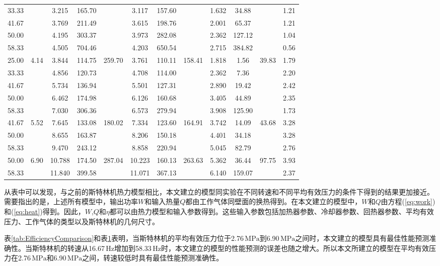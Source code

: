 \begin{table}
\begin{center}
\begin{tabular}{cccccccccccc}
		33.33	&&3.215	&165.70	&&3.117	&157.60	&&1.632	&34.88	&&1.21\\
		41.67	&&3.769	&211.49	&&3.615	&198.76	&&2.001	&65.37	&&1.21\\
		50.00	&&4.195	&303.37	&&3.973	&282.08	&&2.362	&127.12	&&1.04\\
		58.33	&&4.505	&704.46	&&4.203	&650.54	&&2.715	&384.82	&&0.56\\
		\midrule
		25.00	&\multirow{5}{*}{4.14}	&3.844	&114.75	&\multirow{5}{*}{259.70}	&3.761	&110.11	&\multirow{5}{*}{158.41}	&1.818	&1.56	&\multirow{5}{*}{39.83}	&1.79\\
		33.33	&&4.856	&120.73	&&4.708	&114.00	&&2.362	&7.36	&&2.20\\
		41.67	&&5.734	&136.94	&&5.501	&127.31	&&2.890	&19.42	&&2.42\\
		50.00	&&6.462	&174.98	&&6.126	&160.68	&&3.405	&44.89	&&2.35\\
		58.33	&&7.030	&306.36	&&6.573	&279.94	&&3.908	&125.90	&&1.73\\
		\midrule
		41.67	&\multirow{3}{*}{5.52}	&7.645	&133.08	&\multirow{3}{*}{180.02}	&7.334	&123.60	&\multirow{3}{*}{164.91}	&3.742	&14.09	&\multirow{3}{*}{43.68}	&3.28\\
		50.00	&&8.655	&163.87	&&8.206	&150.18	&&4.401	&34.18	&&3.28\\
		58.33	&&9.470	&243.12	&&8.858	&220.94	&&5.045	&82.79	&&2.76\\
		\midrule
		50.00	&\multirow{2}{*}{6.90}	&10.788	&174.50	&\multirow{2}{*}{287.04}	&10.223	&160.13	&\multirow{2}{*}{263.63}	&5.362	&36.44	&\multirow{2}{*}{97.75}		&3.93\\
		58.33	&&11.840	&399.58	&&11.071	&367.13	&&6.140	&159.07	&&2.37\\
		\bottomrule
	\end{tabular}
	\end{center}
	\label{tab:PowerComparison}
\end{table}

从表中可以发现，与之前的斯特林机热力模型相比，本文建立的模型同实验在不同转速和不同平均有效压力的条件下得到的结果更加接近。需要指出的是，上述所有模型中，输出功率$W$和输入热量$Q$都由工作气体同壁面的换热得到。在本文建立的模型中，$W$和$Q$由方程(\ref{eq:work})和(\ref{eq:heat})得到。因此，$W$,$Q$和$\eta$都可以由热力模型和输入参数得到。这些输入参数包括加热器参数、冷却器参数、回热器参数、平均有效压力、工作气体的类型以及斯特林机的几何尺寸。

表\ref{tab:EfficiencyComparison}和表\ref{tab:PowerComparison}表明，当斯特林机的平均有效压力位于2.76$\,\mathrm{MPa}$到6.90$\,\mathrm{MPa}$之间时，本文建立的模型具有最佳性能预测准确性。当斯特林机的转速从16.67$\,\mathrm{Hz}$增加到58.33$\,\mathrm{Hz}$时，本文建立的模型的性能预测的误差也随之增大。所以本文所建立的模型在平均有效压力在2.76$\,\mathrm{MPa}$和6.90$\,\mathrm{MPa}$之间，转速较低时具有最佳性能预测准确性。

